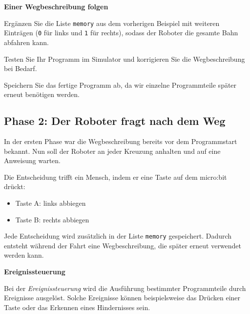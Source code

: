 \begin{myexercise}
    \textbf{Einer Wegbeschreibung folgen}

    Ergänzen Sie die Liste \texttt{memory} aus dem vorherigen
    Beispiel mit weiteren Einträgen (\texttt{0} für links
    und \texttt{1} für rechts), sodass der Roboter die
    gesamte Bahn abfahren kann.

    Testen Sie Ihr Programm im Simulator und korrigieren
    Sie die Wegbeschreibung bei Bedarf.

    Speichern Sie das fertige Programm ab, da wir
    einzelne Programmteile später erneut benötigen werden.
\end{myexercise}


\subsection{Phase 2: Der Roboter fragt nach dem Weg}

In der ersten Phase war die Wegbeschreibung bereits
vor dem Programmstart bekannt. Nun soll der Roboter
an jeder Kreuzung anhalten und auf eine Anweisung
warten.

Die Entscheidung trifft ein Mensch, indem er eine
Taste auf dem micro:bit drückt:
\begin{itemize}
    \item Taste A: links abbiegen
    \item Taste B: rechts abbiegen
\end{itemize}

Jede Entscheidung wird zusätzlich in der Liste
\texttt{memory} gespeichert. Dadurch entsteht während
der Fahrt eine Wegbeschreibung, die später erneut
verwendet werden kann.

\begin{mydefinition}
    \textbf{Ereignissteuerung}

    Bei der \emph{Ereignissteuerung} wird die Ausführung
    bestimmter Programmteile durch Ereignisse ausgelöst.
    Solche Ereignisse können beispielsweise das Drücken
    einer Taste oder das Erkennen eines Hindernisses sein.
\end{mydefinition}


